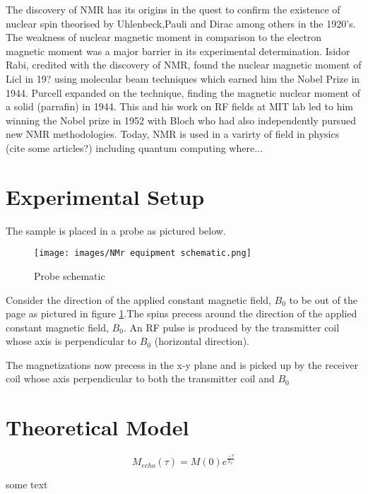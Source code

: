 \documentclass[%
 reprint,
 amsmath,amssymb,
 aps,
]{revtex4-2}
\begin{document}
The discovery of NMR has its origins in the quest to confirm the existence of nuclear spin theorised by Uhlenbeck,Pauli and Dirac among others in the 1920's. The weakness of nuclear magnetic moment in comparison to the electron magnetic moment was a major barrier in its experimental determination. Isidor Rabi, credited with the discovery of NMR, found the nuclear magnetic moment of Licl in 19? using molecular beam techniques \cite{rabi_new_1938} which earned him the Nobel Prize in 1944. Purcell expanded on the technique, finding the magnetic nuclear moment of a solid (parrafin) \cite{purcell_resonance_1946} in 1944. This and his work on RF fields at MIT lab led to him winning the Nobel prize in 1952 with Bloch who had also independently pursued new NMR methodologies.
Today, NMR is used in a varirty of field in physics (cite some articles?) including quantum computing where...



\section{\label{sec:level2}Experimental Setup}

The sample is placed in a probe as pictured below.


\begin{figure}[H]
\texttt{[image: images/NMr equipment schematic.png]}%
\caption{\label{fig:schematic}Probe schematic}
\end{figure}

Consider the direction  of the applied constant magnetic field, $B_0$ to be out of the page as pictured in figure \ref{fig:schematic}.The spins precess around the direction  of the applied constant magnetic field, $B_0$.
An RF pulse is produced by the transmitter coil whose axis is perpendicular to $B_0$ (horizontal direction).

The magnetizations now precess in the x-y plane and is picked up by the receiver coil whose axis perpendicular to both the transmitter coil and $B_0$


\section{Theoretical Model}
\begin{equation}
 M_{echo}(\tau)  = M(0)e^\frac{-\tau}{T_{2}'}
\end{equation}

some text
\end{document}
